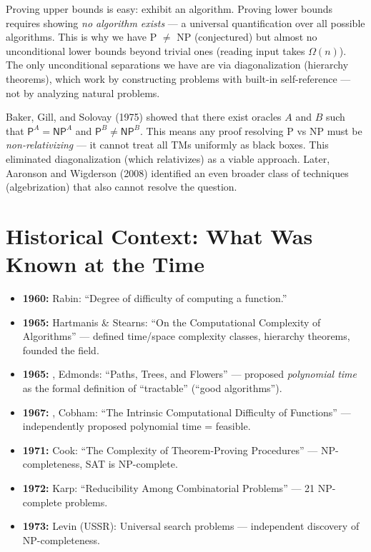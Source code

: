 Proving upper bounds is easy: exhibit an algorithm. Proving lower bounds requires showing \emph{no algorithm exists} — a universal quantification over all possible algorithms. This is why we have P $\neq$ NP (conjectured) but almost no unconditional lower bounds beyond trivial ones (reading input takes $\Omega(n)$). The only unconditional separations we have are via diagonalization (hierarchy theorems), which work by constructing problems with built-in self-reference — not by analyzing natural problems.

Baker, Gill, and Solovay (1975) showed that there exist oracles $A$ and $B$ such that $\mathsf{P}^A = \mathsf{NP}^A$ and $\mathsf{P}^B \neq \mathsf{NP}^B$. This means any proof resolving P vs NP must be \emph{non-relativizing} — it cannot treat all TMs uniformly as black boxes. This eliminated diagonalization (which relativizes) as a viable approach. Later, Aaronson and Wigderson (2008) identified an even broader class of techniques (algebrization) that also cannot resolve the question.

\section{Historical Context: What Was Known at the Time}
\label{sec:complexity:context}

\begin{itemize}
\item \textbf{1960:} Rabin: ``Degree of difficulty of computing a function.''
\item \textbf{1965:} Hartmanis \& Stearns: ``On the Computational Complexity of Algorithms'' — defined time/space complexity classes, hierarchy theorems, founded the field.
\item \textbf{1965:} \cite{Edmonds1965}, Edmonds: ``Paths, Trees, and Flowers'' — proposed \emph{polynomial time} as the formal definition of ``tractable'' (``good algorithms'').
\item \textbf{1967:} \cite{Cobham1965}, Cobham: ``The Intrinsic Computational Difficulty of Functions'' — independently proposed polynomial time = feasible.
\item \textbf{1971:} Cook: ``The Complexity of Theorem-Proving Procedures'' — NP-completeness, SAT is NP-complete.
\item \textbf{1972:} Karp: ``Reducibility Among Combinatorial Problems'' — 21 NP-complete problems.
\item \textbf{1973:} Levin (USSR): Universal search problems — independent discovery of NP-completeness.
\end{itemize}

